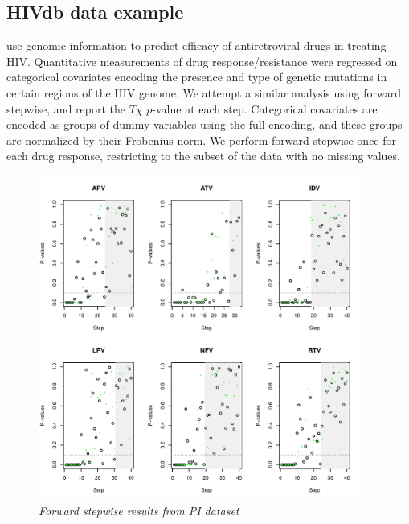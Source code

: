 \documentclass{imsart}
\begin{document}
\subsection{HIVdb data example}
\label{sec:hiv}

\cite{HIV} use genomic information to predict efficacy of antiretroviral
drugs in treating HIV. Quantitative measurements of drug
response/resistance were regressed on categorical covariates encoding
the presence and type of genetic mutations in certain regions of the HIV
genome. We attempt a similar
analysis using forward stepwise, and report the $T\chi$ $p$-value at each step.
Categorical covariates are encoded as groups of dummy variables using
the full encoding, and these groups are normalized by their Frobenius
norm. We perform forward stepwise once
for each drug response, restricting to the subset of the data with
no missing values.

\begin{figure}[!htp]
\begin{center}
\includegraphics[width=0.95\textwidth]{../figs/HIV_PI.pdf}
\caption{\small \it Forward stepwise results from PI dataset}
\label{fig:HIVPI}
\end{center}
\end{figure}
\end{document}
